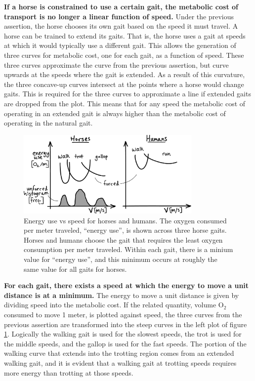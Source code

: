 \textbf{If a horse is constrained to use a certain gait, the metabolic cost of transport is no longer a linear function of speed.} Under the previous assertion, the horse chooses its own gait based on the speed it must travel. A horse can be trained to extend its gaits. That is, the horse uses a gait at speeds at which it would typically use a different gait. This allows the generation of three curves for metabolic cost, one for each gait, as a function of speed. These three curves approximate the curve from the previous assertion, but curve upwards at the speeds where the gait is extended. As a result of this curvature, the three concave-up curves intersect at the points where a horse would change gaits. This is required for the three curves to approximate a line if extended gaits are dropped from the plot. This means that for any speed the metabolic cost of operating in an extended gait is always higher than the metabolic cost of operating in the natural gait.

\begin{figure}[h]		%
\begin{centering}
\includegraphics[width=0.8\textwidth]{Figures/HorseLocomotion}\par
\end{centering}
\caption[Plot: Energy Use vs Speed for Horses and Humans]{Energy use vs speed for horses and humans. The oxygen consumed per meter traveled, ``energy use'', is shown across three horse gaits. Horses and humans choose the gait that requires the least oxygen consumption per meter traveled. Within each gait, there is a minium value for ``energy use'', and this minimum occurs at roughly the same value for all gaits for horses.}
\label{fig:HorseLocomotion}
\end{figure}
%

\textbf{For each gait, there exists a speed at which the energy to move a unit distance is at a minimum.}  The energy to move a unit distance is given by dividing speed into the metabolic cost. If the related quantity, volume O$_2$ consumed to move 1 meter, is plotted against speed, the three curves from the previous assertion are transformed into the steep curves in the left plot of figure \ref{fig:HorseLocomotion}. Logically the walking gait is used for the slowest speeds, the trot is used for the middle speeds, and the gallop is used for the fast speeds. The portion of the walking curve that extends into the trotting region comes from an extended walking gait, and it is evident that a walking gait at trotting speeds requires more energy than trotting at those speeds.

